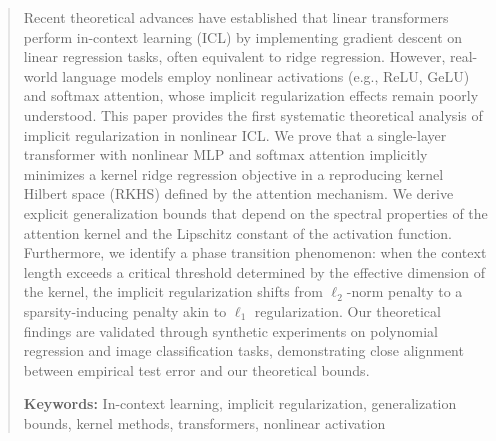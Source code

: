 \begin{abstract}
	
Recent theoretical advances have established that linear transformers perform in-context learning (ICL) by implementing gradient descent on linear regression tasks, often equivalent to ridge regression. However, real-world language models employ nonlinear activations (e.g., ReLU, GeLU) and softmax attention, whose implicit regularization effects remain poorly understood. This paper provides the first systematic theoretical analysis of implicit regularization in nonlinear ICL. We prove that a single-layer transformer with nonlinear MLP and softmax attention implicitly minimizes a kernel ridge regression objective in a reproducing kernel Hilbert space (RKHS) defined by the attention mechanism. We derive explicit generalization bounds that depend on the spectral properties of the attention kernel and the Lipschitz constant of the activation function. Furthermore, we identify a phase transition phenomenon: when the context length exceeds a critical threshold determined by the effective dimension of the kernel, the implicit regularization shifts from $\ell_2$-norm penalty to a sparsity-inducing penalty akin to $\ell_1$ regularization. Our theoretical findings are validated through synthetic experiments on polynomial regression and image classification tasks, demonstrating close alignment between empirical test error and our theoretical bounds.

\textbf{Keywords:} In-context learning, implicit regularization, generalization bounds, kernel methods, transformers, nonlinear activation

\end{abstract}
